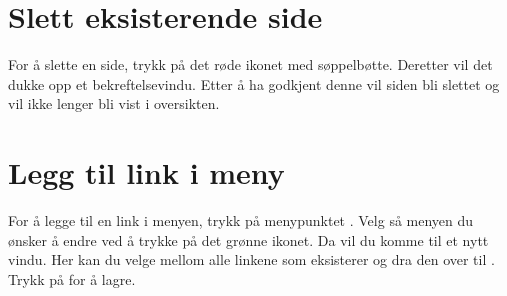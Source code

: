 \begin{figure}[H]
    \centering
    \label{fig:cms-edit-information}
\end{figure}

\section{Slett eksisterende side}
For å slette en side, trykk på det røde ikonet med søppelbøtte. Deretter vil det dukke opp et bekreftelsevindu. Etter å ha godkjent denne vil siden bli slettet og vil ikke lenger bli vist i oversikten.

\begin{figure}[H]
    \centering
    \label{fig:cms-delete-page}
\end{figure}


\section{Legg til link i meny}
For å legge til en link i menyen, trykk på menypunktet . Velg så menyen du ønsker å endre ved å trykke på det grønne ikonet. Da vil du komme til et nytt vindu. Her kan du velge mellom alle linkene som eksisterer og dra den over til . Trykk på  for å lagre.

\begin{figure}[H]
    \centering
    \label{fig:cms-menu}
\end{figure}

